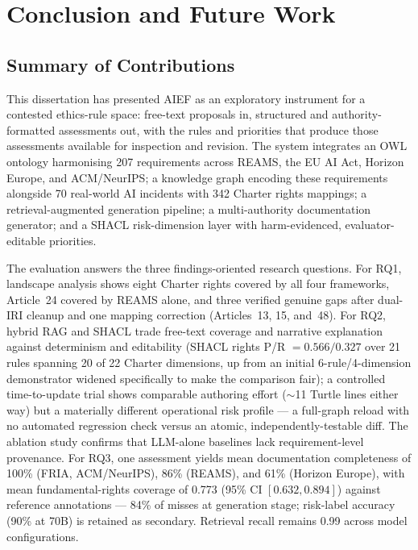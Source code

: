\chapter{Conclusion and Future Work}
\label{ch:conclusion}

\section{Summary of Contributions}

This dissertation has presented AIEF as an exploratory instrument for a contested ethics-rule space: free-text proposals in, structured and authority-formatted assessments out, with the rules and priorities that produce those assessments available for inspection and revision. The system integrates an OWL ontology harmonising 207 requirements across REAMS, the EU AI Act, Horizon Europe, and ACM/NeurIPS; a knowledge graph encoding these requirements alongside 70 real-world AI incidents with 342 Charter rights mappings; a retrieval-augmented generation pipeline; a multi-authority documentation generator; and a SHACL risk-dimension layer with harm-evidenced, evaluator-editable priorities.

The evaluation answers the three findings-oriented research questions. For RQ1, landscape analysis shows eight Charter rights covered by all four frameworks, Article~24 covered by REAMS alone, and three verified genuine gaps after dual-IRI cleanup and one mapping correction (Articles~13, 15, and~48). For RQ2, hybrid RAG and SHACL trade free-text coverage and narrative explanation against determinism and editability (SHACL rights P/R $=0.566/0.327$ over 21 rules spanning 20 of 22 Charter dimensions, up from an initial 6-rule/4-dimension demonstrator widened specifically to make the comparison fair); a controlled time-to-update trial shows comparable authoring effort ($\sim$11 Turtle lines either way) but a materially different operational risk profile --- a full-graph reload with no automated regression check versus an atomic, independently-testable diff. The ablation study confirms that LLM-alone baselines lack requirement-level provenance. For RQ3, one assessment yields mean documentation completeness of 100\% (FRIA, ACM/NeurIPS), 86\% (REAMS), and 61\% (Horizon Europe), with mean fundamental-rights coverage of 0.773 (95\% CI $[0.632, 0.894]$) against reference annotations --- 84\% of misses at generation stage; risk-label accuracy (90\% at 70B) is retained as secondary. Retrieval recall remains 0.99 across model configurations.

